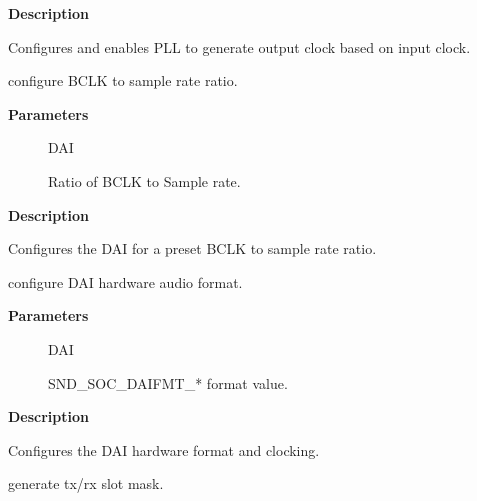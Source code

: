 \documentclass[a4paper,8pt,english]{sphinxmanual}
\begin{document}
\textbf{Description}

Configures and enables PLL to generate output clock based on input clock.

\begin{fulllineitems}
\label{sound/kernel-api/alsa-driver-api:c.snd_soc_dai_set_bclk_ratio}
configure BCLK to sample rate ratio.

\end{fulllineitems}


\textbf{Parameters}
\begin{description}
\item[{}] \leavevmode
DAI

\item[{}] \leavevmode
Ratio of BCLK to Sample rate.

\end{description}

\textbf{Description}

Configures the DAI for a preset BCLK to sample rate ratio.

\begin{fulllineitems}
\label{sound/kernel-api/alsa-driver-api:c.snd_soc_dai_set_fmt}
configure DAI hardware audio format.

\end{fulllineitems}


\textbf{Parameters}
\begin{description}
\item[{}] \leavevmode
DAI

\item[{}] \leavevmode
SND\_SOC\_DAIFMT\_* format value.

\end{description}

\textbf{Description}

Configures the DAI hardware format and clocking.

\begin{fulllineitems}
\label{sound/kernel-api/alsa-driver-api:c.snd_soc_xlate_tdm_slot_mask}
generate tx/rx slot mask.

\end{fulllineitems}
\end{document}

